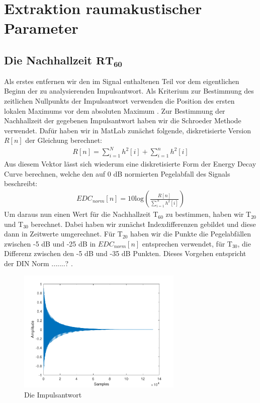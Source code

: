 \chapter{Extraktion raumakustischer Parameter}
\section{Die Nachhallzeit $\mathbf{RT_{60}}$}
\label{sec:rt60}
Als erstes entfernen wir den im Signal enthaltenen Teil vor dem eigentlichen Beginn der zu analysierenden Impulsantwort.
Als Kriterium zur Bestimmung des zeitlichen Nullpunkts der Impulsantwort verwenden die Position des ersten lokalen Maximums vor dem absoluten Maximum .
Zur Bestimmung der Nachhallzeit der gegebenen Impulsantwort haben wir die Schroeder Methode \cite{Schroeder65} verwendet.
Dafür haben wir in MatLab zunächst folgende, diskretisierte Version $R[n]$ der Gleichung berechnet:
\begin{align*}
R[n] = \sum_{i=1}^N h^2[i] + \sum_{i=1}^n h^2[i]
\end{align*}
Aus diesem Vektor lässt sich wiederum eine diskretisierte Form der Energy Decay Curve berechnen, welche den auf 0 dB normierten Pegelabfall des Signals  beschreibt:
\begin{align*}
EDC_{norm}[n] = 10 \mathrm{log} \left(\frac{R[n]}{\sum_{i=1}^N h^2[i]}\right)
\end{align*}
Um daraus nun einen Wert für die Nachhallzeit T$_60$ zu bestimmen, haben wir T$_{20}$ und T$_{30}$ berechnet.
Dabei haben wir zunächst Indexdifferenzen gebildet und diese dann in Zeitwerte umgerechnet.
Für T$_{20}$ haben wir die Punkte die Pegelabfällen zwischen -5 dB und -25 dB in $EDC_{norm}[n]$ entsprechen verwendet, für T$_{30}$, die Differenz zwischen den -5 dB und -35 dB Punkten.
Dieses Vorgehen entspricht der DIN Norm .......? .
  




\begin{figure}[H]
    \center
    \includegraphics[width = 0.7\textwidth]{figures/samples}
    \caption{Die Impulsantwort}
    \label{fig:im}
\end{figure}

